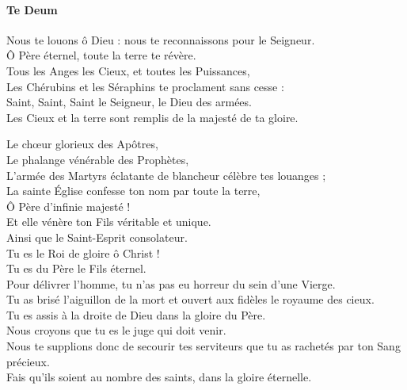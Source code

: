 \documentclass[twoside]{article}
\begin{document}
\begin{paracol}[1]{2}

\switchcolumn
\paragraph{Te Deum}
\vfill
Nous te louons ô Dieu : nous te reconnaissons pour le Seigneur.\\
Ô Père éternel, toute la terre te révère.\\
Tous les Anges les Cieux, et toutes les Puissances,\\
Les Chérubins et les Séraphins te proclament sans cesse :\\

Saint, Saint, Saint le Seigneur, le Dieu des armées.\\
Les Cieux et la terre sont remplis de la majesté de ta gloire.\\

\vfill
\newpage
\null\vfill

Le chœur glorieux des Apôtres,\\
Le phalange vénérable des Prophètes,\\
L'armée des Martyrs éclatante de blancheur célèbre tes louanges ;\\

La sainte Église confesse ton nom par toute la terre,\\
Ô Père d'infinie majesté !\\
Et elle vénère ton Fils véritable et unique.\\
Ainsi que le Saint-Esprit consolateur.\\
Tu es le Roi de gloire ô Christ !\\
Tu es du Père le Fils éternel.\\

Pour délivrer l'homme, tu n'as pas eu horreur du sein d'une Vierge.\\

Tu as brisé l'aiguillon de la mort et ouvert aux fidèles le royaume des cieux.\\

\vfill
\newpage
\null\vfill
Tu es assis à la droite de Dieu dans la gloire du Père.\\
Nous croyons que tu es le juge qui doit venir.\\

Nous te supplions donc de secourir tes serviteurs que tu as rachetés par ton Sang précieux.\\
Fais qu'ils soient au nombre des saints, dans la gloire éternelle.\\


\end{paracol}
\end{document}
